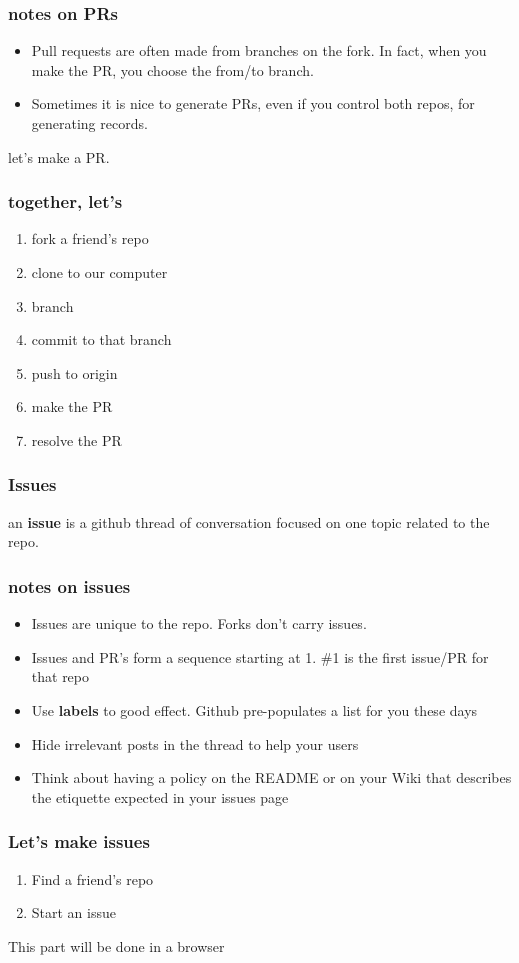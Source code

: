 \documentclass[14pt,aspectratio=1610]{beamer} %
\newcommand{\fframe}[2]{
   \begin{frame}
\frametitle{#1}
#2
\end{frame}
}
\begin{document}
\fframe{notes on PRs}
{
\begin{itemize}
	\item Pull requests are often made from branches on the fork.  In fact, when you make the PR, you choose the from/to branch.
	\item Sometimes it is nice to generate PRs, even if you control both repos, for generating records.
\end{itemize}

let's make a PR.  
}



\fframe{together, let's}
{
	\begin{enumerate}
		\item fork a friend's repo
		\item clone to our computer
		\item branch
		\item commit to that branch
		\item push to origin
		\item make the PR
		\item resolve the PR
	\end{enumerate}
}

\fframe{Issues}
{
	\begin{definition}
an {\bf issue} is a github thread of conversation focused on one topic related to the repo.
	\end{definition}

}


\fframe{notes on issues}
{
	\begin{itemize}
\item Issues are unique to the repo.  Forks don't carry issues.
\item Issues and PR's form a sequence starting at 1.  \#1 is the first issue/PR for that repo
\item Use {\bf labels}  to good effect.  Github pre-populates a list for you these days
\item Hide irrelevant posts in the thread to help your users
\item Think about having a policy on the README or on your Wiki that describes the etiquette expected in your issues page
	\end{itemize}
}

\fframe{Let's make issues}
{
\begin{enumerate}
	\item Find a friend's repo
	\item Start an issue
\end{enumerate}

\vspace{\baselineskip}
This part will be done in a browser
}
\end{document}
